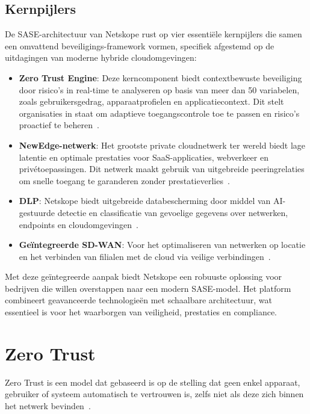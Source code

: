 \subsection{Kernpijlers}
De SASE-architectuur van Netskope rust op vier essentiële kernpijlers die samen een omvattend beveiligings-framework vormen, specifiek afgestemd op de uitdagingen van moderne hybride cloudomgevingen:

\begin{itemize}
  \item \textbf{Zero Trust Engine}: Deze kerncomponent biedt contextbewuste beveiliging door risico's in real-time te analyseren op basis van meer dan 50 variabelen, zoals gebruikersgedrag, apparaatprofielen en applicatiecontext. Dit stelt organisaties in staat om adaptieve toegangscontrole toe te passen en risico's proactief te beheren~\autocite{Netskope2025-2}.
  \item \textbf{NewEdge-netwerk}: Het grootste private cloudnetwerk ter wereld biedt lage latentie en optimale prestaties voor SaaS-applicaties, webverkeer en privétoepassingen. Dit netwerk maakt gebruik van uitgebreide peeringrelaties om snelle toegang te garanderen zonder prestatieverlies~\autocite{Netskope2025-1}.
  \item \textbf{DLP}: Netskope biedt uitgebreide databescherming door middel van AI-gestuurde detectie en classificatie van gevoelige gegevens over netwerken, endpoints en cloudomgevingen~\autocite{Netskope2025-1}.
  \item \textbf{Geïntegreerde SD-WAN}: Voor het optimaliseren van netwerken op locatie en het verbinden van filialen met de cloud via veilige verbindingen~\autocite{Netskope2025-1}.
\end{itemize}

\vspace{2ex}

Met deze geïntegreerde aanpak biedt Netskope een robuuste oplossing voor bedrijven die willen overstappen naar een modern SASE-model. Het platform combineert geavanceerde technologieën met schaalbare architectuur, wat essentieel is voor het waarborgen van veiligheid, prestaties en compliance.

\section{Zero Trust}
Zero Trust is een model dat gebaseerd is op de stelling dat geen enkel apparaat, gebruiker of systeem automatisch te vertrouwen is, zelfs niet als deze zich binnen het netwerk bevinden~\autocite{Netskope2024}.

